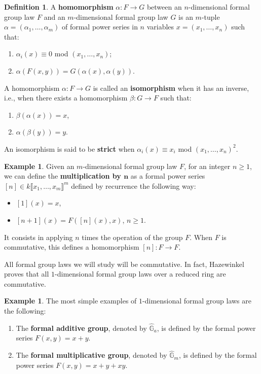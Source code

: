 \documentclass{report}
\theoremstyle{definition}
\newtheorem{definition}[equation]{Definition}
\newtheorem{example}[equation]{Example}
\begin{document}
\begin{definition}
A \textbf{homomorphism} $\alpha:F\rightarrow G$ between an $n$-dimensional formal group law $F$ and an $m$-dimensional formal group law $G$ is an $m$-tuple $\alpha=(\alpha_1,\ldots,\alpha_m)$ of formal power series in $n$ variables $x=(x_1,\ldots,x_n)$ such that:
\begin{enumerate}
\item $\alpha_i(x)\equiv0$ mod $(x_1,\ldots,x_n)$;
\item $\alpha(F(x,y))=G(\alpha(x),\alpha(y))$.
\end{enumerate}

A homomorphism $\alpha:F\rightarrow G$ is called an \textbf{isomorphism} when it has an inverse, i.e., when there exists a homomorphism $\beta:G\rightarrow F$ such that:
\begin{enumerate}
\item $\beta(\alpha(x))=x$,
\item $\alpha(\beta(y))=y$.
\end{enumerate}

An isomorphism is said to be \textbf{strict} when $\alpha_i(x)\equiv x_i$ mod $(x_1,\ldots,x_n)^2$.
\end{definition}

\begin{example}
Given an $m$-dimensional formal group law $F$, for an integer $n\geq1$, we can define the \textbf{multiplication by $\boldsymbol{n}$} as a formal power series $[n]\in k\llbracket x_1,\ldots,x_m\rrbracket^m$ defined by recurrence the following way:
\begin{itemize}
\item $[1](x)=x$,
\item $[n+1](x)=F([n](x),x)$, $n\geq1$.
\end{itemize}

It consists in applying $n$ times the operation of the group $F$. When $F$ is commutative, this defines a homomorphism $[n]:F\rightarrow F$.
%
\end{example}

All formal group laws we will study will be commutative. In fact, Hazewinkel \cite[Section~I.6.1]{hazewinkel1978formal} proves that all $1$-dimensional formal group laws over a reduced ring are commutative.

\begin{example}
\label{exa:formal-additive-multiplicative}
The most simple examples of $1$-dimensional formal group laws are the following:
\begin{enumerate}
\item The \textbf{formal additive group}, denoted by $\widehat{\mathbb{G}}_a$, is defined by the formal power series $F(x,y)=x+y$.

\item The \textbf{formal multiplicative group}, denoted by $\widehat{\mathbb{G}}_m$, is defined by the formal power series $F(x,y)=x+y+xy$.
\end{enumerate}
\end{example}
\end{document}
